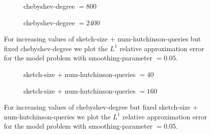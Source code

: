 \begin{figure}[ht]
    \begin{subfigure}[b]{0.49\columnwidth}
        
        \caption{\gls{chebyshev-degree} $=800$}
        \label{fig:5-experiments-electronic-structure-convergence-nv-m800}
    \end{subfigure}
    \begin{subfigure}[b]{0.49\columnwidth}
        
        \caption{\gls{chebyshev-degree} $=2400$}
        \label{fig:5-experiments-electronic-structure-convergence-nv-m2400}
    \end{subfigure}
    \caption{For increasing values of \gls{sketch-size} $+$ \gls{num-hutchinson-queries}
    but fixed \gls{chebyshev-degree} we plot the $L^1$ relative approximation error 
    for the model problem with \gls{smoothing-parameter} $=0.05$.}
    \label{fig:5-experiments-electronic-structure-convergence-nv}
\end{figure}

\begin{figure}[ht]
    \centering
    \begin{subfigure}[b]{0.49\columnwidth}
        
        \caption{\gls{sketch-size} $+$ \gls{num-hutchinson-queries} $=40$}
        \label{fig:5-experiments-electronic-structure-convergence-m-nv40}
    \end{subfigure}
    \begin{subfigure}[b]{0.49\columnwidth}
        
        \caption{\gls{sketch-size} $+$ \gls{num-hutchinson-queries} $=160$}
        \label{fig:5-experiments-electronic-structure-convergence-m-nv160}
    \end{subfigure}
    \caption{For increasing values of \gls{chebyshev-degree} but fixed
    \gls{sketch-size} $+$ \gls{num-hutchinson-queries} we plot the $L^1$ relative
    approximation error 
    for the model problem with \gls{smoothing-parameter} $=0.05$.}
    \label{fig:5-experiments-electronic-structure-convergence-m}
\end{figure}

